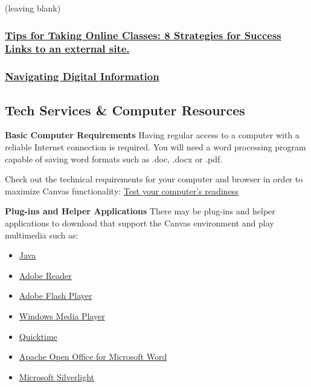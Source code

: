 \documentclass[
]{book}
\providecommand{\tightlist}{%
  \setlength{\itemsep}{0pt}\setlength{\parskip}{0pt}}
\begin{document}
(leaving blank)

\hypertarget{tips-for-taking-online-classes-8-strategies-for-success-links-to-an-external-site.}{%
\subsubsection{\texorpdfstring{\href{https://www.northeastern.edu/graduate/blog/tips-for-taking-online-classes/}{Tips for Taking Online Classes: 8 Strategies for Success Links to an external site.}}{Tips for Taking Online Classes: 8 Strategies for Success Links to an external site.}}\label{tips-for-taking-online-classes-8-strategies-for-success-links-to-an-external-site.}}

\hypertarget{navigating-digital-information}{%
\subsubsection{\texorpdfstring{\href{https://www.youtube.com/watch?v=pLlv2o6UfTU\&list=PL8dPuuaLjXtN07XYqqWSKpPrtNDiCHTzU}{Navigating Digital Information}}{Navigating Digital Information}}\label{navigating-digital-information}}

\hypertarget{tech-services-computer-resources}{%
\subsection{Tech Services \& Computer Resources}\label{tech-services-computer-resources}}

\textbf{Basic Computer Requirements}
Having regular access to a computer with a reliable Internet connection is required. You will need a word processing program capable of saving word formats such as .doc, .docx or .pdf.

Check out the technical requirements for your computer and browser in order to maximize Canvas functionality: \href{https://apps.3cmediasolutions.org/oei/tools/computer-readiness.html}{Test your computer's readiness}

\textbf{Plug-ins and Helper Applications}
There may be plug-ins and helper applications to download that support the Canvas environment and play multimedia such as:

\begin{itemize}
\tightlist
\item
  \href{https://www.java.com/en/download/}{Java}
\item
  \href{https://get.adobe.com/cn/reader/}{Adobe Reader}
\item
  \href{https://www.flash.cn/}{Adobe Flash Player}
\item
  \href{https://support.microsoft.com/en-us/windows/get-windows-media-player-81718e0d-cfce-25b1-aee3-94596b658287}{Windows Media Player}
\item
  \href{https://support.apple.com/kb/DL837?locale=zh_CN}{Quicktime}
\item
  \href{https://www.openoffice.org/download/index.html}{Apache Open Office for Microsoft Word}
\item
  \href{https://www.microsoft.com/silverlight/}{Microsoft Silverlight}
\end{itemize}
\end{document}
